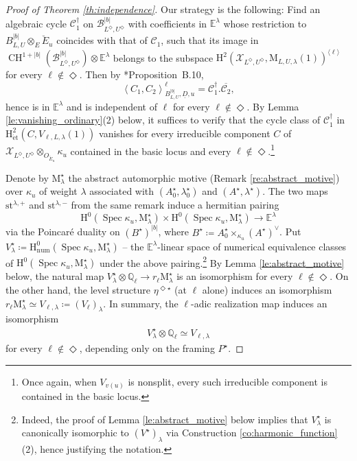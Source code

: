 \documentclass[12pt]{amsart}
\numberwithin{equation}{section}
\theoremstyle{plain}
\theoremstyle{definition}
\theoremstyle{remark}
\renewcommand{\c}[1]{\mathcal{#1}}
\renewcommand{\d}[1]{\mathbb{#1}}
\renewcommand{\r}[1]{\mathrm{#1}}
\renewcommand{\(}{\left(}
\renewcommand{\)}{\right)}
\newcommand{\ang}[1]{\langle{#1}\rangle}
\newcommand{\ol}[1]{\overline{#1}{}}
\newcommand{\ul}{\underline}
\newcommand{\cB}{\c B}
\newcommand{\cC}{\c C}
\newcommand{\cX}{\c X}
\newcommand{\dE}{\d E}
\newcommand{\dQ}{\d Q}
\newcommand{\rH}{\r H}
\newcommand{\rM}{\r M}
\newcommand{\llangle}{\left\langle}
\newcommand{\rrangle}{\right\rangle}
\newcommand{\et}{{\acute{\r{e}}\r{t}}}
\newcommand{\num}{\r{num}}
\newcommand{\st}{\r{st}}
\DeclareMathOperator{\CH}{CH}
\DeclareMathOperator{\Spec}{Spec}
\begin{document}
\begin{proof}[Proof of Theorem \ref{th:independence}]
Our strategy is the following: Find an algebraic cycle $\cC_1^\dag$ on $\cB_{L^\Diamond,U^\Diamond}^{|b|}$ with coefficients in $\dE^\lambda$ whose restriction to $B_{L,U}^{|b|}\otimes_{E}\breve{E}_u$ coincides with that of $\cC_1$, such that its image in $\CH^{1+|b|}(\cB_{L^\Diamond,U^\Diamond}^{|b|})\otimes\dE^\lambda$ belongs to the subspace $\rH^2(\cX_{L^\Diamond,U^\Diamond},\rM_{L,U,\lambda}(1))^{\ang{\ell}}$ for every $\ell\not\in\Diamond$. Then by \cite{LL21}*{Proposition~B.10},
\[
\llangle C_1,C_2\rrangle_{B_{L,U}^{|b|},\ul{D},u}^\ell=\cC_1^\dag.\ol{\cC_2},
\]
hence is in $\dE^\lambda$ and is independent of $\ell$ for every $\ell\not\in\Diamond$. By Lemma \ref{le:vanishing_ordinary}(2) below, it suffices to verify that the cycle class of $\cC_1^\dag$ in $\rH^2_{\et}(C,V_{\ell,L,\lambda}(1))$ vanishes for every irreducible component $C$ of $\cX_{L^\Diamond,U^\Diamond}\otimes_{O_{\breve{E}_u}}\kappa_u$ contained in the basic locus and every $\ell\not\in\Diamond$.\footnote{Once again, when $V_{v(u)}$ is nonsplit, every such irreducible component is contained in the basic locus.}






Denote by $\rM^\star_\lambda$ the abstract automorphic motive (Remark \ref{re:abstract_motive}) over $\kappa_u$ of weight $\lambda$ associated with $(A^\star_0,\lambda^\star_0)$ and $(A^\star,\lambda^\star)$. The two maps $\st^{\lambda,+}$ and $\st^{\lambda,-}$ from the same remark induce a hermitian pairing
\[
\rH^0(\Spec\kappa_u,\rM^\star_\lambda)\times\rH^0(\Spec\kappa_u,\rM^\star_\lambda)\to\dE^\lambda
\]
via the Poincar\'{e} duality on $(B^\star)^{|b|}$, where $B^\star\coloneqq A_0^\star\times_{\kappa_u}(A^\star)^\vee$. Put $V^\star_\lambda\coloneqq\rH^0_\num(\Spec\kappa_u,\rM^\star_\lambda)$ -- the $\dE^\lambda$-linear space of numerical equivalence classes of $\rH^0(\Spec\kappa_u,\rM^\star_\lambda)$ under the above pairing.\footnote{Indeed, the proof of Lemma \ref{le:abstract_motive} below implies that $V^\star_\lambda$ is canonically isomorphic to $(V^\star)_\lambda$ via Construction \ref{co:harmonic_function}(2), hence justifying the notation.} By Lemma \ref{le:abstract_motive} below, the natural map $V^\star_\lambda\otimes\dQ_\ell\to r_\ell\rM^\star_\lambda$ is an isomorphism for every $\ell\not\in\Diamond$. On the other hand, the level structure $\eta^{\Diamond\star}$ (at $\ell$ alone) induces an isomorphism $r_\ell\rM^\star_\lambda\simeq V_{\ell,\lambda}\coloneqq(V_\ell)_\lambda$. In summary, the $\ell$-adic realization map induces an isomorphism
\begin{align}\label{eq:independence_5}
V^\star_\lambda\otimes\dQ_\ell\simeq V_{\ell,\lambda}
\end{align}
for every $\ell\not\in\Diamond$, depending only on the framing $P^\star$.




\end{proof}
\end{document}
